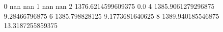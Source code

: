 0 nan nan
1 nan nan
2 1376.6214599609375 0.0
4 1385.9061279296875 9.28466796875
6 1385.798828125 9.1773681640625
8 1389.940185546875 13.3187255859375
